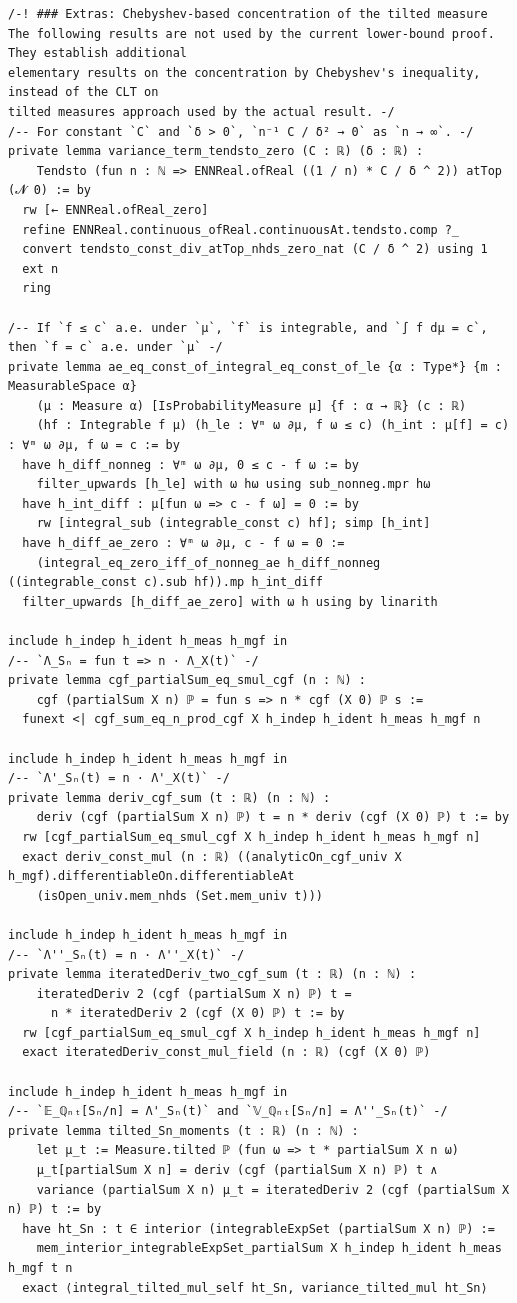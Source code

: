 \begin{lstlisting}
/-! ### Extras: Chebyshev-based concentration of the tilted measure
The following results are not used by the current lower-bound proof. They establish additional
elementary results on the concentration by Chebyshev's inequality, instead of the CLT on
tilted measures approach used by the actual result. -/
/-- For constant `C` and `δ > 0`, `n⁻¹ C / δ² → 0` as `n → ∞`. -/
private lemma variance_term_tendsto_zero (C : ℝ) (δ : ℝ) :
    Tendsto (fun n : ℕ => ENNReal.ofReal ((1 / n) * C / δ ^ 2)) atTop (𝓝 0) := by
  rw [← ENNReal.ofReal_zero]
  refine ENNReal.continuous_ofReal.continuousAt.tendsto.comp ?_
  convert tendsto_const_div_atTop_nhds_zero_nat (C / δ ^ 2) using 1
  ext n
  ring

/-- If `f ≤ c` a.e. under `μ`, `f` is integrable, and `∫ f dμ = c`, then `f = c` a.e. under `μ` -/
private lemma ae_eq_const_of_integral_eq_const_of_le {α : Type*} {m : MeasurableSpace α}
    (μ : Measure α) [IsProbabilityMeasure μ] {f : α → ℝ} (c : ℝ)
    (hf : Integrable f μ) (h_le : ∀ᵐ ω ∂μ, f ω ≤ c) (h_int : μ[f] = c) : ∀ᵐ ω ∂μ, f ω = c := by
  have h_diff_nonneg : ∀ᵐ ω ∂μ, 0 ≤ c - f ω := by
    filter_upwards [h_le] with ω hω using sub_nonneg.mpr hω
  have h_int_diff : μ[fun ω => c - f ω] = 0 := by
    rw [integral_sub (integrable_const c) hf]; simp [h_int]
  have h_diff_ae_zero : ∀ᵐ ω ∂μ, c - f ω = 0 :=
    (integral_eq_zero_iff_of_nonneg_ae h_diff_nonneg ((integrable_const c).sub hf)).mp h_int_diff
  filter_upwards [h_diff_ae_zero] with ω h using by linarith

include h_indep h_ident h_meas h_mgf in
/-- `Λ_Sₙ = fun t => n · Λ_X(t)` -/
private lemma cgf_partialSum_eq_smul_cgf (n : ℕ) :
    cgf (partialSum X n) ℙ = fun s => n * cgf (X 0) ℙ s :=
  funext <| cgf_sum_eq_n_prod_cgf X h_indep h_ident h_meas h_mgf n

include h_indep h_ident h_meas h_mgf in
/-- `Λ'_Sₙ(t) = n · Λ'_X(t)` -/
private lemma deriv_cgf_sum (t : ℝ) (n : ℕ) :
    deriv (cgf (partialSum X n) ℙ) t = n * deriv (cgf (X 0) ℙ) t := by
  rw [cgf_partialSum_eq_smul_cgf X h_indep h_ident h_meas h_mgf n]
  exact deriv_const_mul (n : ℝ) ((analyticOn_cgf_univ X h_mgf).differentiableOn.differentiableAt
    (isOpen_univ.mem_nhds (Set.mem_univ t)))

include h_indep h_ident h_meas h_mgf in
/-- `Λ''_Sₙ(t) = n · Λ''_X(t)` -/
private lemma iteratedDeriv_two_cgf_sum (t : ℝ) (n : ℕ) :
    iteratedDeriv 2 (cgf (partialSum X n) ℙ) t =
      n * iteratedDeriv 2 (cgf (X 0) ℙ) t := by
  rw [cgf_partialSum_eq_smul_cgf X h_indep h_ident h_meas h_mgf n]
  exact iteratedDeriv_const_mul_field (n : ℝ) (cgf (X 0) ℙ)

include h_indep h_ident h_meas h_mgf in
/-- `𝔼_ℚₙₜ[Sₙ/n] = Λ'_Sₙ(t)` and `𝕍_ℚₙₜ[Sₙ/n] = Λ''_Sₙ(t)` -/
private lemma tilted_Sn_moments (t : ℝ) (n : ℕ) :
    let μ_t := Measure.tilted ℙ (fun ω => t * partialSum X n ω)
    μ_t[partialSum X n] = deriv (cgf (partialSum X n) ℙ) t ∧
    variance (partialSum X n) μ_t = iteratedDeriv 2 (cgf (partialSum X n) ℙ) t := by
  have ht_Sn : t ∈ interior (integrableExpSet (partialSum X n) ℙ) :=
    mem_interior_integrableExpSet_partialSum X h_indep h_ident h_meas h_mgf t n
  exact ⟨integral_tilted_mul_self ht_Sn, variance_tilted_mul ht_Sn⟩
\end{lstlisting}
